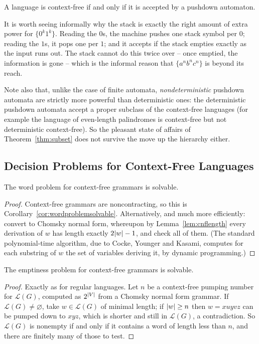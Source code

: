 \documentclass[a4paper]{scrartcl}
\newcommand{\lang}{\mathcal{L}}
\begin{document}
\begin{theorem}
	A language is context-free if and only if it is accepted by a pushdown automaton.
\end{theorem}

It is worth seeing informally why the stack is exactly the right amount of extra power for $\{0^k1^k\}$. Reading the $0$s, the machine pushes one stack symbol per $0$; reading the $1$s, it pops one per $1$; and it accepts if the stack empties exactly as the input runs out. The stack cannot do this twice over -- once emptied, the information is gone -- which is the informal reason that $\{a^nb^nc^n\}$ is beyond its reach.

Note also that, unlike the case of finite automata, \emph{nondeterministic} pushdown automata are strictly more powerful than deterministic ones: the deterministic pushdown automata accept a proper subclass of the context-free languages (for example the language of even-length palindromes is context-free but not deterministic context-free). So the pleasant state of affairs of Theorem~\ref{thm:subset} does not survive the move up the hierarchy either.

\subsection{Decision Problems for Context-Free Languages}

\begin{proposition}
	The word problem for context-free grammars is solvable.
\end{proposition}

\begin{proof}
	Context-free grammars are noncontracting, so this is Corollary~\ref{cor:wordproblemsolvable}. Alternatively, and much more efficiently: convert to Chomsky normal form, whereupon by Lemma~\ref{lem:cnflength} every derivation of $w$ has length exactly $2\lvert w\rvert-1$, and check all of them. (The standard polynomial-time algorithm, due to Cocke, Younger and Kasami, computes for each substring of $w$ the set of variables deriving it, by dynamic programming.)
\end{proof}

\begin{proposition}
	The emptiness problem for context-free grammars is solvable.
\end{proposition}

\begin{proof}
	Exactly as for regular languages. Let $n$ be a context-free pumping number for $\lang(G)$, computed as $2^{\lvert V\rvert}$ from a Chomsky normal form grammar. If $\lang(G) \neq \varnothing$, take $w \in \lang(G)$ of minimal length; if $\lvert w\rvert \geq n$ then $w = xuyvz$ can be pumped down to $xyz$, which is shorter and still in $\lang(G)$, a contradiction. So $\lang(G)$ is nonempty if and only if it contains a word of length less than $n$, and there are finitely many of those to test.
\end{proof}
\end{document}
